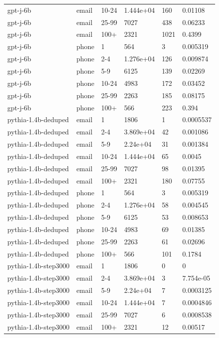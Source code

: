 \begin{tabular}{llllll}
gpt-j-6b & email & 10-24 & 1.444e+04 & 160 & 0.01108 \\
gpt-j-6b & email & 25-99 & 7027 & 438 & 0.06233 \\
gpt-j-6b & email & 100+ & 2321 & 1021 & 0.4399 \\
gpt-j-6b & phone & 1 & 564 & 3 & 0.005319 \\
gpt-j-6b & phone & 2-4 & 1.276e+04 & 126 & 0.009874 \\
gpt-j-6b & phone & 5-9 & 6125 & 139 & 0.02269 \\
gpt-j-6b & phone & 10-24 & 4983 & 172 & 0.03452 \\
gpt-j-6b & phone & 25-99 & 2263 & 185 & 0.08175 \\
gpt-j-6b & phone & 100+ & 566 & 223 & 0.394 \\
pythia-1.4b-deduped & email & 1 & 1806 & 1 & 0.0005537 \\
pythia-1.4b-deduped & email & 2-4 & 3.869e+04 & 42 & 0.001086 \\
pythia-1.4b-deduped & email & 5-9 & 2.24e+04 & 31 & 0.001384 \\
pythia-1.4b-deduped & email & 10-24 & 1.444e+04 & 65 & 0.0045 \\
pythia-1.4b-deduped & email & 25-99 & 7027 & 98 & 0.01395 \\
pythia-1.4b-deduped & email & 100+ & 2321 & 180 & 0.07755 \\
pythia-1.4b-deduped & phone & 1 & 564 & 3 & 0.005319 \\
pythia-1.4b-deduped & phone & 2-4 & 1.276e+04 & 58 & 0.004545 \\
pythia-1.4b-deduped & phone & 5-9 & 6125 & 53 & 0.008653 \\
pythia-1.4b-deduped & phone & 10-24 & 4983 & 69 & 0.01385 \\
pythia-1.4b-deduped & phone & 25-99 & 2263 & 61 & 0.02696 \\
pythia-1.4b-deduped & phone & 100+ & 566 & 101 & 0.1784 \\
pythia-1.4b-step3000 & email & 1 & 1806 & 0 & 0 \\
pythia-1.4b-step3000 & email & 2-4 & 3.869e+04 & 3 & 7.754e-05 \\
pythia-1.4b-step3000 & email & 5-9 & 2.24e+04 & 7 & 0.0003125 \\
pythia-1.4b-step3000 & email & 10-24 & 1.444e+04 & 7 & 0.0004846 \\
pythia-1.4b-step3000 & email & 25-99 & 7027 & 6 & 0.0008538 \\
pythia-1.4b-step3000 & email & 100+ & 2321 & 12 & 0.00517 \\

\end{tabular}
